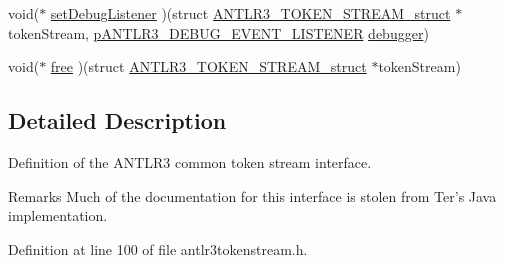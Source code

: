 \begin{DoxyCompactItemize}
\item 
void($\ast$ \hyperlink{struct_a_n_t_l_r3___t_o_k_e_n___s_t_r_e_a_m__struct_a8bca05af8122d0235fda5888c9fda1b8}{set\-Debug\-Listener} )(struct \hyperlink{struct_a_n_t_l_r3___t_o_k_e_n___s_t_r_e_a_m__struct}{A\-N\-T\-L\-R3\-\_\-\-T\-O\-K\-E\-N\-\_\-\-S\-T\-R\-E\-A\-M\-\_\-struct} $\ast$token\-Stream, \hyperlink{antlr3interfaces_8h_ab226a624395fcc0b8fe2b29ae60b6116}{p\-A\-N\-T\-L\-R3\-\_\-\-D\-E\-B\-U\-G\-\_\-\-E\-V\-E\-N\-T\-\_\-\-L\-I\-S\-T\-E\-N\-E\-R} \hyperlink{struct_a_n_t_l_r3___t_o_k_e_n___s_t_r_e_a_m__struct_ad1c4befd9be9830fbe87993c4b944f0d}{debugger})
\item 
void($\ast$ \hyperlink{struct_a_n_t_l_r3___t_o_k_e_n___s_t_r_e_a_m__struct_a8037dc687f70300d50abfc5cca904de8}{free} )(struct \hyperlink{struct_a_n_t_l_r3___t_o_k_e_n___s_t_r_e_a_m__struct}{A\-N\-T\-L\-R3\-\_\-\-T\-O\-K\-E\-N\-\_\-\-S\-T\-R\-E\-A\-M\-\_\-struct} $\ast$token\-Stream)
\end{DoxyCompactItemize}


\subsection{Detailed Description}
Definition of the A\-N\-T\-L\-R3 common token stream interface. \begin{DoxyRemark}{Remarks}
Much of the documentation for this interface is stolen from Ter's Java implementation. 
\end{DoxyRemark}


Definition at line 100 of file antlr3tokenstream.\-h.



